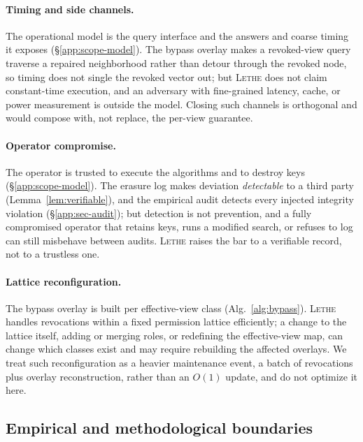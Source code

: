 \documentclass[sigconf, nonacm, review]{acmart}
\begin{document}
\paragraph{Timing and side channels.}
The operational model is the query interface and the answers and coarse timing
it exposes (\S\ref{app:scope-model}). The bypass overlay makes a revoked-view
query traverse a repaired neighborhood rather than detour through the revoked
node, so timing does not single the revoked vector out; but \textsc{Lethe} does
not claim constant-time execution, and an adversary with fine-grained latency,
cache, or power measurement is outside the model. Closing such channels is
orthogonal and would compose with, not replace, the per-view guarantee.

\paragraph{Operator compromise.}
The operator is trusted to execute the algorithms and to destroy keys
(\S\ref{app:scope-model}). The erasure log makes deviation \emph{detectable} to
a third party (Lemma~\ref{lem:verifiable}), and the empirical audit detects
every injected integrity violation (\S\ref{app:sec-audit}); but detection is not
prevention, and a fully compromised operator that retains keys, runs a modified
search, or refuses to log can still misbehave between audits. \textsc{Lethe}
raises the bar to a verifiable record, not to a trustless one.

\paragraph{Lattice reconfiguration.}
The bypass overlay is built per effective-view class (Alg.~\ref{alg:bypass}).
\textsc{Lethe} handles revocations within a fixed permission lattice
efficiently; a change to the lattice itself, adding or merging roles, or
redefining the effective-view map, can change which classes exist and may
require rebuilding the affected overlays. We treat such reconfiguration as a
heavier maintenance event, a batch of revocations plus overlay reconstruction,
rather than an $O(1)$ update, and do not optimize it here.

\subsection{Empirical and methodological boundaries}
\label{app:limits-emp}
\end{document}
